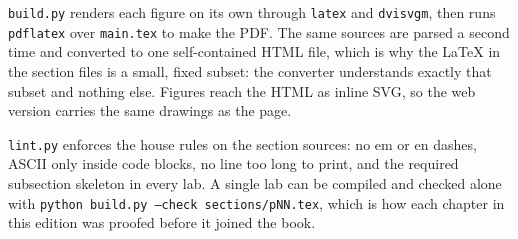 \texttt{build.py} renders each figure on its own through \texttt{latex} and \texttt{dvisvgm}, then runs \texttt{pdflatex} over \texttt{main.tex} to make the PDF. The same sources are parsed a second time and converted to one self-contained HTML file, which is why the LaTeX in the section files is a small, fixed subset: the converter understands exactly that subset and nothing else. Figures reach the HTML as inline SVG, so the web version carries the same drawings as the page.

\texttt{lint.py} enforces the house rules on the section sources: no em or en dashes, ASCII only inside code blocks, no line too long to print, and the required subsection skeleton in every lab. A single lab can be compiled and checked alone with \texttt{python build.py --check sections/pNN.tex}, which is how each chapter in this edition was proofed before it joined the book.

